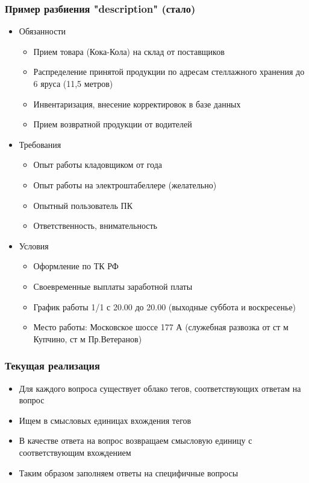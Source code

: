 \documentclass[xcolor=table,xetex,mathserif,serif]{beamer}
\begin{document}
\begin{frame}
	\frametitle{Пример разбиения "description" (стало)}

	\begin{itemize}
		\item Обязанности
		      \begin{itemize}
			      \item Прием товара (Кока-Кола) на склад от поставщиков
			      \item Распределение принятой продукции по адресам стеллажного хранения до 6 яруса (11,5 метров)
			      \item Инвентаризация, внесение корректировок в базе данных
			      \item Прием возвратной продукции от водителей
		      \end{itemize}
		\item Требования
		      \begin{itemize}
			      \item Опыт работы кладовщиком от года
			      \item Опыт работы на электроштабеллере (желательно)
			      \item Опытный пользователь ПК
			      \item Ответственность, внимательность
		      \end{itemize}
		\item Условия
		      \begin{itemize}
			      \item Оформление по ТК РФ
			      \item Своевременные выплаты заработной платы
			      \item График работы 1/1 с 20.00 до 20.00 (выходные суббота и воскресенье)
			      \item Место работы: Московское шоссе 177 А (служебная развозка от ст м Купчино, ст м Пр.Ветеранов)
		      \end{itemize}
	\end{itemize}
\end{frame}


\begin{frame}
	\frametitle{Текущая реализация}

	\begin{itemize}
		\item Для каждого вопроса существует облако тегов, соответствующих ответам на вопрос
		\item Ищем в смысловых единицах вхождения тегов
		\item В качестве ответа на вопрос возвращаем смысловую единицу с соответствующим вхождением
		\item Таким образом заполняем ответы на специфичные вопросы
	\end{itemize}
\end{frame}
\end{document}
